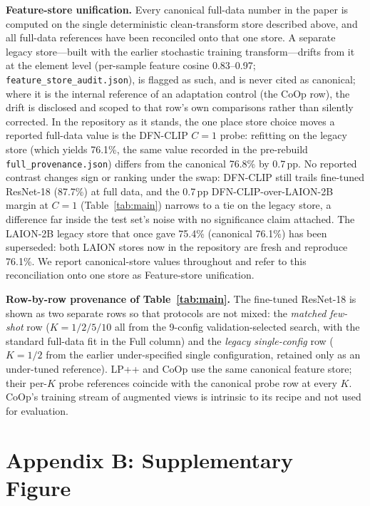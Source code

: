 \documentclass[10pt,a4paper]{article}
\begin{document}
\textbf{Feature-store unification.} Every canonical full-data number in the paper is computed on the single deterministic clean-transform store described above, and all full-data references have been reconciled onto that one store. A separate legacy store---built with the earlier stochastic training transform---drifts from it at the element level (per-sample feature cosine 0.83--0.97; \texttt{feature\_store\_audit.json}), is flagged as such, and is never cited as canonical; where it is the internal reference of an adaptation control (the CoOp row), the drift is disclosed and scoped to that row's own comparisons rather than silently corrected. In the repository as it stands, the one place store choice moves a reported full-data value is the DFN-CLIP $C{=}1$ probe: refitting on the legacy store (which yields 76.1\%, the same value recorded in the pre-rebuild \texttt{full\_provenance.json}) differs from the canonical 76.8\% by 0.7\,pp. No reported contrast changes sign or ranking under the swap: DFN-CLIP still trails fine-tuned ResNet-18 (87.7\%) at full data, and the 0.7\,pp DFN-CLIP-over-LAION-2B margin at $C{=}1$ (Table~\ref{tab:main}) narrows to a tie on the legacy store, a difference far inside the test set's noise with no significance claim attached. The LAION-2B legacy store that once gave 75.4\% (canonical 76.1\%) has been superseded: both LAION stores now in the repository are fresh and reproduce 76.1\%. We report canonical-store values throughout and refer to this reconciliation onto one store as Feature-store unification.

\textbf{Row-by-row provenance of Table~\ref{tab:main}.} The fine-tuned ResNet-18 is shown as two separate rows so that protocols are not mixed: the \emph{matched few-shot} row ($K{=}1/2/5/10$ all from the 9-config validation-selected search, with the standard full-data fit in the Full column) and the \emph{legacy single-config} row ($K{=}1/2$ from the earlier under-specified single configuration, retained only as an under-tuned reference). LP++ and CoOp use the same canonical feature store; their per-$K$ probe references coincide with the canonical probe row at every $K$. CoOp's training stream of augmented views is intrinsic to its recipe and not used for evaluation.


\section*{Appendix B: Supplementary Figure}
\end{document}
